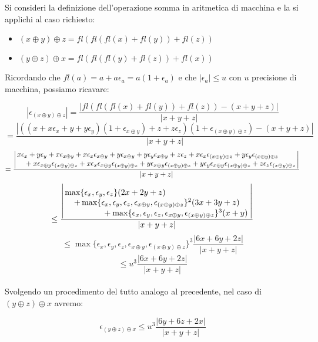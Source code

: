 \begin{center}
\footnotesize\noindent{}\end{center}

\noindent Si consideri la definizione dell'operazione somma in aritmetica di macchina e la si applichi al caso richiesto:

\begin{itemize}

\item \((x \oplus y) \oplus z = fl( fl( fl(x) + fl(y) ) + fl(z)) \)
\item \((y \oplus z) \oplus x = fl( fl( fl(y) + fl(z) ) + fl(x)) \)

\end{itemize}

\noindent Ricordando che \(fl(a) = a + a\epsilon_a = a (1 + \epsilon_a)\) e che \(|\epsilon_a| \leq u\) con \(u\) precisione di macchina, possiamo ricavare:

\[
|\epsilon_{(x \oplus y) \oplus z }| = \frac{|fl( fl( fl(x) + fl(y) ) + fl(z)) - (x + y + z)|}{|x+y+z|}
\]
\[=
\frac{|((x + x\epsilon_x + y + y\epsilon_y)(1+\epsilon_{x \oplus y}) + z + z\epsilon_z)(1 +\epsilon_{(x \oplus y) \oplus z }) - (x+y+z)|}{|x+y+z|}
\]
\[
=\frac{\left|\splitfrac{x\epsilon_x + y\epsilon_y + x\epsilon_{x \oplus y} + x\epsilon_x\epsilon_{x \oplus y} + y\epsilon_{x \oplus y} + y\epsilon_y\epsilon_{x \oplus y} + z\epsilon_z + x\epsilon_x\epsilon_{(x \oplus y) \oplus z} + y\epsilon_y\epsilon_{(x \oplus y) \oplus z}    }{     + x\epsilon_{x \oplus y}\epsilon_{(x \oplus y) \oplus z} + x\epsilon_x\epsilon_{x \oplus y}\epsilon_{(x \oplus y) \oplus z} + y\epsilon_{x \oplus y}\epsilon_{(x \oplus y) \oplus z} + y\epsilon_y\epsilon_{x \oplus y}\epsilon_{(x \oplus y) \oplus z} + z\epsilon_z\epsilon_{(x \oplus y) \oplus z}}\right|}{|x+y+z|}
\]
\[
\leq \frac{\left|\splitfrac{\max \{\epsilon_x, \epsilon_y, \epsilon_z\}(2x+2y+z) }{  \splitfrac{+ \max \{\epsilon_x, \epsilon_y, \epsilon_z, \epsilon_{x \oplus y}, \epsilon_{(x \oplus y) \oplus z}\} ^2 (3x+3y+z) }{+  \max \{\epsilon_x, \epsilon_y, \epsilon_z, \epsilon_{x \oplus y}, \epsilon_{(x \oplus y) \oplus z}\} ^3 (x+y)}}\right|}{|x+y+z|}
\]
\[
\leq \max \{\epsilon_x, \epsilon_y, \epsilon_z, \epsilon_{x \oplus y}, \epsilon_{(x \oplus y) \oplus z}\} ^ 3 \frac{|6x + 6y + 2z|}{|x+y+z|}
\]
\[
\leq u^3 \frac{|6x + 6y + 2z|}{|x+y+z|}
\]
\\
\noindent Svolgendo un procedimento del tutto analogo al precedente, nel caso di \((y \oplus z) \oplus x \) avremo:

\[
\epsilon_{(y \oplus z) \oplus x } \leq u^3 \frac{|6y + 6z + 2x|}{|x+y+z|}
\]
